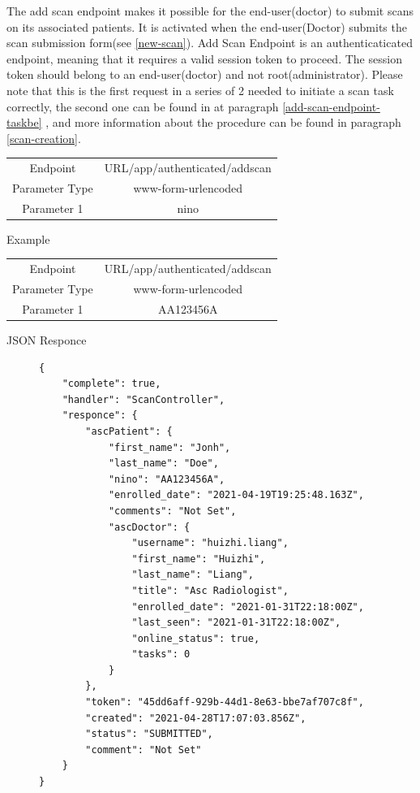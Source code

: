 					\label{add-scan-endpoint-infobe}
					The add scan endpoint makes it possible for the end-user(doctor) to submit scans on its associated patients. It is activated when 
					the end-user(Doctor) submits the scan submission form(see \ref{new-scan}). Add Scan Endpoint is an authenticaticated endpoint, meaning that it requires a 
					valid session token to proceed. The session token should belong to an end-user(doctor) and not root(administrator). Please note that 
					this is the first request in a series of 2 needed to initiate a scan task correctly, the second one can be found in at paragraph \ref{add-scan-endpoint-taskbe} , and 
					more information about the procedure can be found in paragraph \ref{scan-creation}.
					\begin{center}
						\begin{tabular}{ |c|c| } 
							\hline
							Endpoint & {{URL}}/app/authenticated/addscan\\
							Parameter Type & www-form-urlencoded  \\
							Parameter 1 & nino  \\
							\hline
						\end{tabular}
					\end{center}
					Example
					\begin{center}
						\begin{tabular}{ |c|c| } 
							\hline
							Endpoint & {{URL}}/app/authenticated/addscan\\
							Parameter Type & www-form-urlencoded  \\
							Parameter 1 & AA123456A  \\
							\hline
						\end{tabular}
					\end{center}
					JSON Responce
					\begin{figure}[H]
						\iftrue
						\begin{lstlisting}[]
{
	"complete": true,
	"handler": "ScanController",
	"responce": {
		"ascPatient": {
			"first_name": "Jonh",
			"last_name": "Doe",
			"nino": "AA123456A",
			"enrolled_date": "2021-04-19T19:25:48.163Z",
			"comments": "Not Set",
			"ascDoctor": {
				"username": "huizhi.liang",
				"first_name": "Huizhi",
				"last_name": "Liang",
				"title": "Asc Radiologist",
				"enrolled_date": "2021-01-31T22:18:00Z",
				"last_seen": "2021-01-31T22:18:00Z",
				"online_status": true,
				"tasks": 0
			}
		},
		"token": "45dd6aff-929b-44d1-8e63-bbe7af707c8f",
		"created": "2021-04-28T17:07:03.856Z",
		"status": "SUBMITTED",
		"comment": "Not Set"
	}
}
						\end{lstlisting}
					\end{figure}
